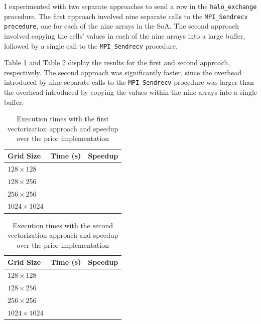 \documentclass[twocolumn, a4paper]{article}
\begin{document}
I experimented with two separate approaches to send a row in the \texttt{halo\_exchange} procedure.
The first approach involved nine separate calls to the \texttt{MPI\_Sendrecv procedure}, one for each of the nine arrays in the SoA.
The second approach involved copying the cells' values in each of the nine arrays into a large buffer, followed by a single call to the \texttt{MPI\_Sendrecv} procedure.

Table \ref{tab:vectorization_1} and Table \ref{tab:vectorization_2} display the results for the first and second approach, respectively.
The second approach was significantly faster, since the overhead introduced by nine separate calls to the \texttt{MPI\_Sendrecv} procedure was larger than the overhead introduced by copying the values within the nine arrays into a single buffer.

\begin{table}[htbp]
  \begin{center}
  \caption{Execution times with the first vectorization approach and speedup over the prior implementation}\label{tab:vectorization_1}
  \begin{tabular}[t]{l | l l} 
      \hline\hline
      Grid Size&Time (s)&Speedup\\
      \hline
      $128 \times 128$&\texttt{}&\texttt{}\\
      $128 \times 256$&\texttt{}&\texttt{}\\
      $256 \times 256$&\texttt{}&\texttt{}\\
      $1024 \times 1024$&\texttt{}&\texttt{}\\
      \hline
    \end{tabular}
  \end{center}
\end{table}

\begin{table}[htbp]
  \begin{center}
  \caption{Execution times with the second vectorization approach and speedup over the prior implementation}\label{tab:vectorization_2}
  \begin{tabular}[t]{l | l l} 
      \hline\hline
      Grid Size&Time (s)&Speedup\\
      \hline
      $128 \times 128$&\texttt{}&\texttt{}\\
      $128 \times 256$&\texttt{}&\texttt{}\\
      $256 \times 256$&\texttt{}&\texttt{}\\
      $1024 \times 1024$&\texttt{}&\texttt{}\\
      \hline
    \end{tabular}
  \end{center}
\end{table}
\end{document}
